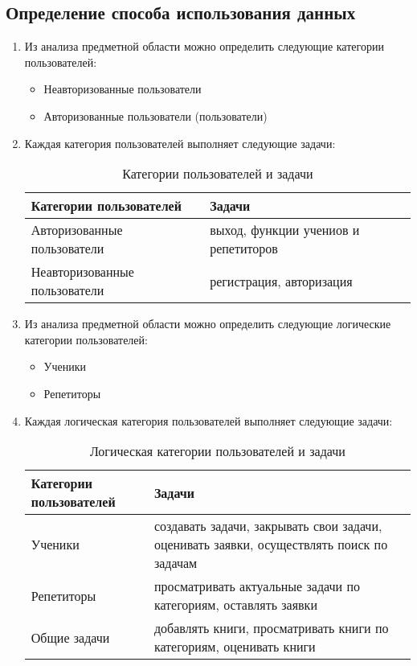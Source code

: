 \subsection{Определение способа использования данных}
\begin{enumerate}

\item Из анализа предметной области можно определить следующие категории пользователей:

\begin{itemize}
\item Неавторизованные пользователи
\item Авторизованные пользователи (пользователи)
\end{itemize}

\item Каждая категория пользователей выполняет следующие задачи:
\begin{table}[h]
\caption{Категории пользователей и задачи}
\medskip
\begin{tabular}{|l|p{10cm}|}
\hline
Категории пользователей & Задачи\\
\hline
Авторизованные пользователи & выход, функции учениов и репетиторов \\
Неавторизованные пользователи & регистрация, авторизация\\ 
\hline
\end{tabular}
\end{table}

\item Из анализа предметной области можно определить следующие логические категории пользователей:
\begin{itemize}
\item Ученики
\item Репетиторы
\end{itemize}

\item Каждая логическая категория пользователей выполняет следующие задачи:
\begin{table}[h]
\caption{Логическая категории пользователей и задачи}
\medskip
\begin{tabular}{|l|p{12cm}|}
\hline
Категории пользователей & Задачи\\
\hline
Ученики & создавать задачи, закрывать свои задачи, оценивать заявки, осуществлять поиск по задачам \\
Репетиторы & просматривать актуальные задачи по категориям, оставлять заявки \\
Общие задачи & добавлять книги, просматривать книги по категориям, оценивать книги \\
\hline
\end{tabular}
\end{table}

\end{enumerate}

